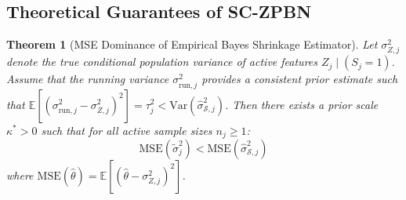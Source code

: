 \documentclass[twocolumn,10pt]{article}
\newtheorem{theorem}{Theorem}
\begin{document}
\subsection{Theoretical Guarantees of SC-ZPBN}

\begin{theorem}[MSE Dominance of Empirical Bayes Shrinkage Estimator]
\label{thm:shrinkage_dominance}
Let $\sigma_{Z,j}^2$ denote the true conditional population variance of active features $Z_j \mid (S_j = 1)$. Assume that the running variance $\sigma_{\mathrm{run}, j}^2$ provides a consistent prior estimate such that $\mathbb{E}[(\sigma_{\mathrm{run}, j}^2 - \sigma_{Z,j}^2)^2] = \tau_j^2 < \mathrm{Var}(\hat{\sigma}_{\mathcal{S}, j}^2)$. Then there exists a prior scale $\kappa^* > 0$ such that for all active sample sizes $n_j \ge 1$:
\begin{equation}
\mathrm{MSE}(\tilde{\sigma}_j^2) < \mathrm{MSE}(\hat{\sigma}_{\mathcal{S}, j}^2)
\end{equation}
where $\mathrm{MSE}(\hat{\theta}) = \mathbb{E}[(\hat{\theta} - \sigma_{Z,j}^2)^2]$.
\end{theorem}
\end{document}
